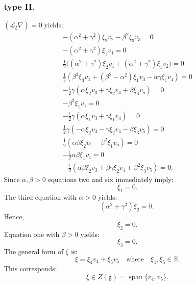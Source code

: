 \documentclass[10pt]{article}
\begin{document}
    \subsubsection{type II.}

$( \mathscr{L}_\xi\nabla)=0$ yields: \begin{eqnarray}
-(\alpha^2+\gamma^2)\xi_2v_2-\beta^2\xi_3v_3 =0\\ 
-(\alpha^2+\gamma^2)\xi_1v_1 =0\\ 
\tfrac{1}{2}\Big((\alpha^2+\gamma^2)\xi_2v_1+(\alpha^2+\gamma^2)\xi_1v_2\Big) =0\\ 
\tfrac{1}{2}(\beta^2\xi_3v_1+(\beta^2-\alpha^2)\xi_1v_3-\alpha\gamma\xi_1 v_4) =0\\ 
-\tfrac{1}{2}\gamma(\alpha\xi_2v_3+\gamma\xi_2v_4+\beta\xi_3v_5)=0\\ 
-\beta^2\xi_1v_1=0\\
-\tfrac{1}{2}\gamma(\alpha\xi_1v_3+\gamma\xi_1v_4) =0\\ 
\tfrac{1}{2}\gamma(-\alpha\xi_2v_3-\gamma\xi_2v_4-\beta\xi_3v_5)=0\\
\tfrac{1}{2}(\alpha\beta\xi_2v_1-\beta^2\xi_1v_5) =0\\ 
-\tfrac{1}{2}\alpha\beta\xi_1v_1=0 \\ 
-\tfrac{1}{2}(\alpha\beta\xi_2v_3+\beta\gamma\xi_2 v_4+\beta^2\xi_3v_5)=0.
\end{eqnarray} 
Since $\alpha, \beta > 0$  equations two and six immediately imply:
\begin{equation*}
\xi_1 = 0.
\end{equation*}
The third equation with $\alpha > 0$ yields:
\begin{equation*}
(\alpha^2 + \gamma^2)\xi_2 = 0,
\end{equation*}
Hence,
\begin{equation*}
\xi_2 = 0.
\end{equation*}
Equation one with $ \beta > 0$ yields:
\begin{equation*}
\xi_3 = 0.
\end{equation*}
The general form of $\xi$ is:
\begin{equation*}
\xi = \xi_4v_4 + \xi_5v_5 \quad \text{where} \quad \xi_4, \xi_5 \in \mathbb{R}.
\end{equation*}
This corresponds:
\begin{equation*}
\xi\in Z(\mathfrak{g}) = \operatorname{span}\{v_4, v_5\}.
\end{equation*}
\end{document}
